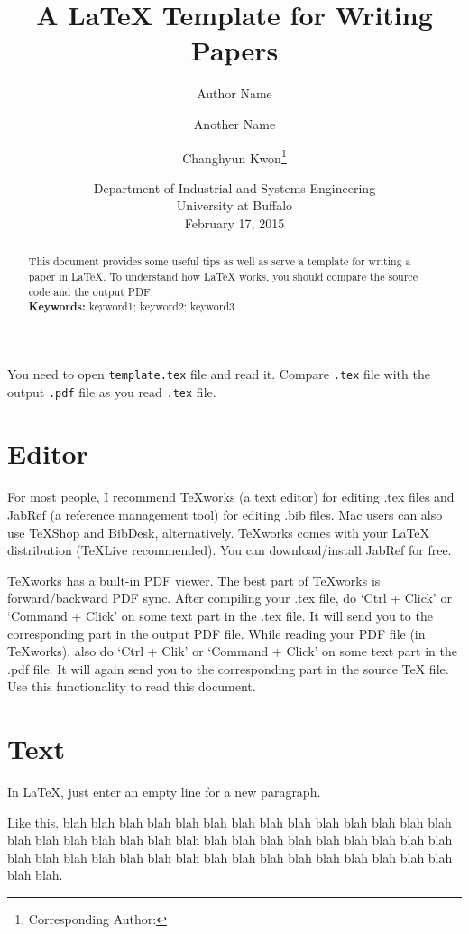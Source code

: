 \documentclass[letterpaper, 11pt]{article}
\title{A LaTeX Template for Writing Papers}
\author{Author Name \and Another Name \and Changhyun Kwon\footnote{Corresponding Author: \email{chkwon@buffalo.edu}}}
\date{Department of Industrial and Systems Engineering\\University at Buffalo\\[0.5cm] February 17, 2015}
\newcommand{\rednote}[1]{{\Large\color{red}#1}}
\begin{document}
\maketitle

\begin{abstract}
This document provides some useful tips as well as serve a template for writing a paper in LaTeX. To understand how LaTeX works, you should compare the source code and the output PDF.\\
\noindent\textbf{Keywords:} keyword1; keyword2; keyword3
\end{abstract}


\rednote{You need to open \texttt{template.tex} file and read it. Compare \texttt{.tex} file with the output \texttt{.pdf} file as you read \texttt{.tex} file.}


\section{Editor} \label{sec:editor}

For most people, I recommend TeXworks (a text editor) for editing .tex files and JabRef (a reference management tool) for editing .bib files. Mac users can also use TeXShop and BibDesk, alternatively. TeXworks comes with your LaTeX distribution (TeXLive recommended). You can download/install JabRef for free.

TeXworks has a built-in PDF viewer. The best part of TeXworks is forward/backward PDF sync. After compiling your .tex file, do `Ctrl + Click' or `Command + Click' on some text part in the .tex file. It will send you to the corresponding part in the output PDF file. While reading your PDF file (in TeXworks), also do `Ctrl + Clik' or `Command + Click' on some text part in the .pdf file. It will again send you to the corresponding part in the source TeX file. Use this functionality to read this document. 











\section{Text} \label{sec:paragraph}
In LaTeX, just enter an empty line for a new paragraph.

Like this. blah blah blah blah blah blah blah blah blah blah blah blah blah blah blah blah blah blah blah blah blah blah blah blah blah blah blah blah blah blah blah blah blah blah blah blah blah blah blah blah blah blah blah blah blah blah blah blah.
\end{document}
